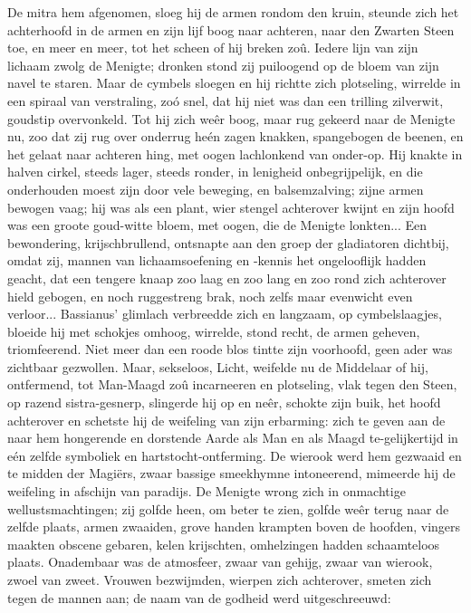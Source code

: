 \documentclass[a4paper, 12pt, oneside, dutch]{article}
\begin{document}
De mitra hem afgenomen, sloeg hij de armen rondom den kruin, steunde zich het achterhoofd in de armen en zijn lijf boog naar achteren, naar den Zwarten Steen toe, en meer en meer, tot het scheen of hij breken zoû. Iedere lijn van zijn lichaam zwolg de Menigte; dronken stond zij puiloogend op de bloem van zijn navel te staren. Maar de cymbels sloegen en hij richtte zich plotseling, wirrelde in een spiraal van verstraling, zoó snel, dat hij niet was dan een trilling zilverwit, goudstip overvonkeld. Tot hij zich weêr boog, maar rug gekeerd naar de Menigte nu, zoo dat zij rug over onderrug heén zagen knakken, spangebogen de beenen, en het gelaat naar achteren hing, met oogen lachlonkend van onder-op. Hij knakte in halven cirkel, steeds lager, steeds ronder, in lenigheid onbegrijpelijk, en die onderhouden moest zijn door vele beweging, en balsemzalving; zijne armen bewogen vaag; hij was als een plant, wier stengel achterover kwijnt en zijn hoofd was een groote goud-witte bloem, met oogen, die de Menigte lonkten... Een bewondering, krijschbrullend, ontsnapte aan den groep der gladiatoren dichtbij, omdat zij, mannen van lichaamsoefening en -kennis het ongelooflijk hadden geacht, dat een tengere knaap zoo laag en zoo lang en zoo rond zich achterover hield gebogen, en noch ruggestreng brak, noch zelfs maar evenwicht even verloor... Bassianus' glimlach verbreedde zich en langzaam, op cymbelslaagjes, bloeide hij met schokjes omhoog, wirrelde, stond recht, de armen geheven, triomfeerend. Niet meer dan een roode blos tintte zijn voorhoofd, geen ader was zichtbaar gezwollen. Maar, sekseloos, Licht, weifelde nu de Middelaar of hij, ontfermend, tot Man-Maagd zoû incarneeren en plotseling, vlak tegen den Steen, op razend sistra-gesnerp, slingerde hij op en neêr, schokte zijn buik, het hoofd achterover en schetste hij de weifeling van zijn erbarming: zich te geven aan de naar hem hongerende en dorstende Aarde als Man en als Maagd te-gelijkertijd in eén zelfde symboliek en hartstocht-ontferming. De wierook werd hem gezwaaid en te midden der Magiërs, zwaar bassige smeekhymne intoneerend, mimeerde hij de weifeling in afschijn van paradijs. De Menigte wrong zich in onmachtige wellustsmachtingen; zij golfde heen, om beter te zien, golfde weêr terug naar de zelfde plaats, armen zwaaiden, grove handen krampten boven de hoofden, vingers maakten obscene gebaren, kelen krijschten, omhelzingen hadden schaamteloos plaats. Onadembaar was de atmosfeer, zwaar van gehijg, zwaar van wierook, zwoel van zweet. Vrouwen bezwijmden, wierpen zich achterover, smeten zich tegen de mannen aan; de naam van de godheid werd uitgeschreeuwd:
\end{document}
